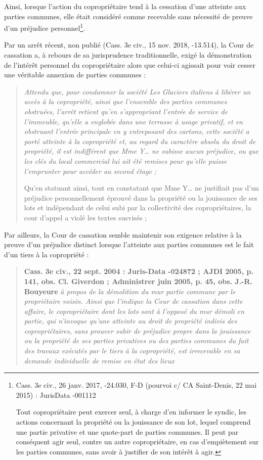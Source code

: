 			Ainsi, lorsque l'action du copropriétaire tend à la cessation d'une atteinte aux parties communes, elle était considéré comme recevable sans nécessité de preuve d'un préjudice personnel\footnote{
			Cass. 3e civ., 26 janv. 2017, -24.030, F-D (pourvoi c/ CA Saint-Denis, 22 mai 2015) : JurisData -001112
			
			Tout copropriétaire peut exercer seul, à charge d'en informer le syndic, les actions concernant la propriété ou la jouissance de son lot, lequel comprend une partie privative et une quote-part de parties communes. Il peut par conséquent agir seul, contre un autre copropriétaire, en cas d'empiètement sur les parties communes, sans avoir à justifier de son intérêt à agir.}.
			
			Par un arrêt récent, non publié (Cass. 3e civ., 15 nov. 2018, -13.514), la Cour de cassation a, à rebours de sa jurisprudence traditionnelle, exigé la démonstration de l’intérêt personnel du copropriétaire alors que celui-ci agissait pour voir cesser une véritable annexion de parties communes :
			\begin{quote}
				{\itshape Attendu que, pour condamner la société Les Glaciers italiens à libérer un accès à la copropriété, ainsi que l’ensemble des parties communes obstruées, l’arrêt retient qu’en s’appropriant l’entrée de service de l’immeuble, qu’elle a englobée dans une terrasse à usage privatif, et en obstruant l’entrée principale en y entreposant des cartons, cette société a porté atteinte à la copropriété et, au regard du caractère absolu du droit de propriété, il est indifférent que Mme Y… ne subisse aucun préjudice, ou que les clés du local commercial lui ait été remises pour qu’elle puisse l’emprunter pour accéder au second étage ;
				
				Qu’en statuant ainsi, tout en constatant que Mme Y… ne justifiait pas d’un préjudice personnellement éprouvé dans la propriété ou la jouissance de ses lots et indépendant de celui subi par la collectivité des copropriétaires, la cour d’appel a violé les textes susvisés ;}
			\end{quote}
			
			Par ailleurs, la Cour de cassation semble maintenir son exigence relative à la preuve d’un préjudice distinct lorsque l’atteinte aux parties communes est le fait d’un tiers à la copropriété :
			\begin{quote}
				{\bfseries Cass. 3e civ., 22 sept. 2004 : Juris-Data -024872 ; AJDI 2005, p. 141, obs. Cl. Giverdon ; Administrer juin 2005, p. 45, obs. J.-R. Bouyeure} {\itshape à propos de la démolition du mur partie commune par le propriétaire voisin. Ainsi que l'indique la Cour de cassation dans cette affaire, le copropriétaire dont les lots sont à l'opposé du mur démoli en partie, qui n'invoque qu'une atteinte au droit de propriété indivis des copropriétaires, sans prouver subir de préjudice propre dans la jouissance ou la propriété de ses parties privatives ou des parties communes du fait des travaux exécutés par le tiers à la copropriété, est irrecevable en sa demande individuelle de remise en état des lieux}
			\end{quote}
			

